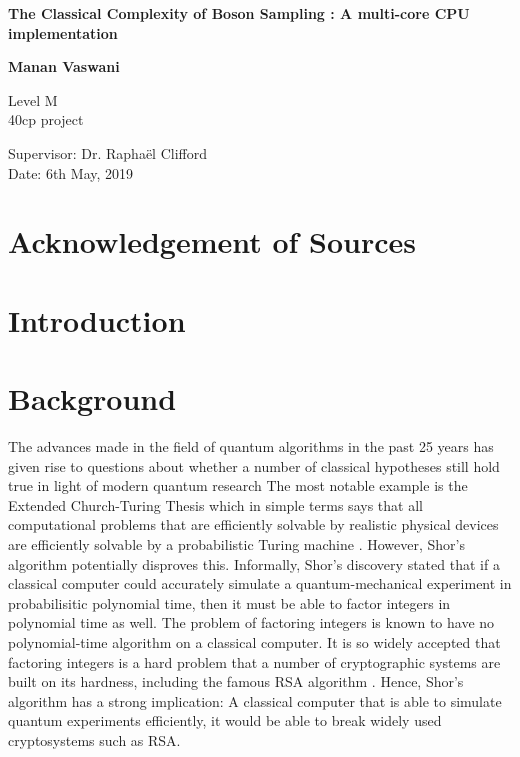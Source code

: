 \documentclass[11pt]{article}
\theoremstyle{theorem}
\theoremstyle{remark}
\theoremstyle{plain}
\theoremstyle{definition}
\begin{document}
\begin{titlepage}
    \begin{center}
        \vspace*{\fill}
        
        \Huge
        \textbf{The Classical Complexity of Boson Sampling : A multi-core CPU implementation}
        
        \LARGE
        
        \vspace{2cm}
        \textbf{Manan Vaswani}
        
        \vfill
        
        Level M\\
        40cp project
        
        \vspace{0.8cm}
        
        
        \Large
        Supervisor: Dr. Rapha\"el Clifford\\
	Date: 6th May, 2019
        
    \end{center}
\end{titlepage}

\newpage
\section*{Acknowledgement of Sources}

\newpage
\tableofcontents
\newpage
\section{Introduction} %


\section{Background} %
The advances made in the field of quantum algorithms in the past 25 years has given rise to questions about whether a number of classical hypotheses still hold true in light of modern quantum research The most notable example is the Extended Church-Turing Thesis which in simple terms says that all computational problems that are efficiently solvable by realistic physical devices are efficiently solvable by a probabilistic Turing machine \cite{kaye2007}. However, Shor's algorithm \cite{shor1995} potentially disproves this. Informally, Shor's discovery stated that if a classical computer could accurately simulate a quantum-mechanical experiment in probabilisitic polynomial time, then it must be able to factor integers in polynomial time as well. The problem of factoring integers is known to have no polynomial-time algorithm on a classical computer. It is so widely accepted that factoring integers is a hard problem that a number of cryptographic systems are built on its hardness, including the famous RSA algorithm \cite{rsa1978}. Hence, Shor's algorithm has a strong implication: A classical computer that is able to simulate quantum experiments efficiently, it would be able to break widely used cryptosystems such as RSA.
\end{document}
